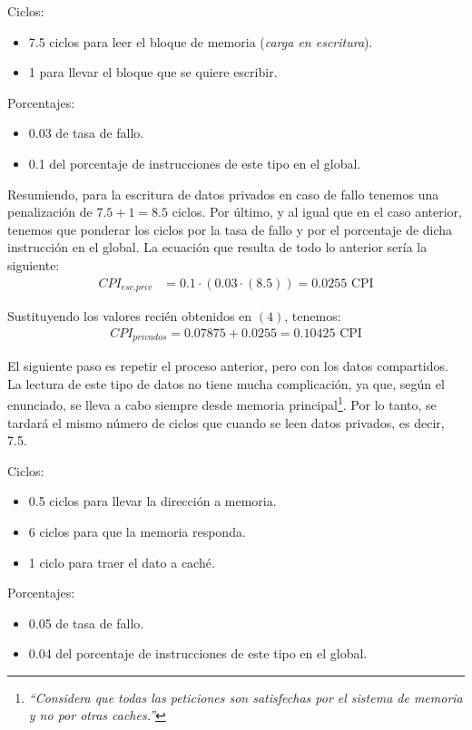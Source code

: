 \documentclass[12pt,a4paper]{article}
\begin{document}
Ciclos:
\begin{itemize}
\item 7.5 ciclos para leer el bloque de memoria (\textit{carga en escritura}).
\item 1 para llevar el bloque que se quiere escribir.
\end{itemize}

Porcentajes:
\begin{itemize}
\item 0.03 de tasa de fallo.
\item 0.1 del porcentaje de instrucciones de este tipo en el global.
\end{itemize}

Resumiendo, para la escritura de datos privados en caso de fallo tenemos una penalización de $7.5+1=8.5$ ciclos. Por último, y al igual que en el caso anterior, tenemos que ponderar los ciclos por la tasa de fallo y por el porcentaje de dicha instrucción en el global. La ecuación que resulta de todo lo anterior sería la siguiente:
\begin{align*}
CPI_{esc.priv}&=0.1\cdot (0.03\cdot (8.5))=0.0255\text{ CPI}
\end{align*}

Sustituyendo los valores recién obtenidos en $(4)$, tenemos:
\begin{align*}
CPI_{privados}=0.07875+0.0255=0.10425 \text{ CPI}
\end{align*}

El siguiente paso es repetir el proceso anterior, pero con los datos compartidos. La lectura de este tipo de datos no tiene mucha complicación, ya que, según el enunciado, se lleva a cabo siempre desde memoria principal\footnote{\textit{``Considera que todas las peticiones son satisfechas por el sistema de memoria y no por otras caches.''}}. Por lo tanto, se tardará el mismo número de ciclos que cuando se leen datos privados, es decir, 7.5. 

Ciclos:
\begin{itemize}
\item 0.5 ciclos para llevar la dirección a memoria.
\item 6 ciclos para que la memoria responda.
\item 1 ciclo para traer el dato a caché.
\end{itemize}

Porcentajes:
\begin{itemize}
\item 0.05 de tasa de fallo.
\item 0.04 del porcentaje de instrucciones de este tipo en el global.
\end{itemize}
\end{document}
